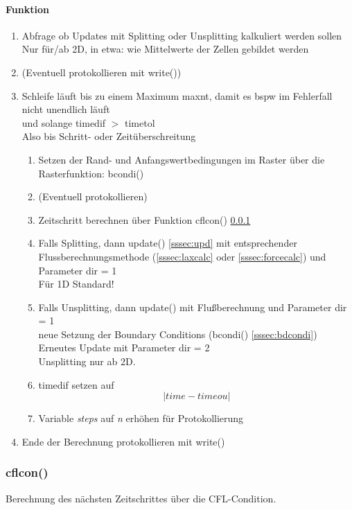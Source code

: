 \documentclass[12pt]{article}
\begin{document}
\paragraph{Funktion}
\renewcommand{\labelenumi}{\theenumi.}
\begin{enumerate}
	\item Abfrage ob Updates mit Splitting oder Unsplitting kalkuliert werden sollen\\
	Nur für/ab 2D, in etwa: wie Mittelwerte der Zellen gebildet werden
	\item (Eventuell protokollieren mit write())
	\item Schleife läuft bis zu einem Maximum maxnt, damit es bspw im Fehlerfall nicht unendlich läuft\\
	und solange timedif $>$ timetol\\
	Also bis Schritt- oder Zeitüberschreitung
	\begin{enumerate}
	\item Setzen der Rand- und Anfangswertbedingungen im Raster über die Rasterfunktion: bcondi()
	\item (Eventuell protokollieren)
	\item Zeitschritt berechnen über Funktion cflcon() \ref{sssec:cflc}
	\item Falls Splitting, dann update() \ref{sssec:upd} mit entsprechender Flussberechnungsmethode (\ref{sssec:laxcalc} oder \ref{sssec:forcecalc}) und Parameter dir = 1\\
	Für 1D Standard!
	\item Falls Unsplitting, dann update() mit Flußberechnung und Parameter dir = 1\\
	neue Setzung der Boundary Conditions (bcondi() \ref{sssec:bdcondi})\\
	Erneutes Update mit Parameter dir = 2\\
	Unsplitting nur ab 2D.
	\item timedif setzen auf 
	\begin{equation}
	|time-timeou|
	\end{equation}
	\item Variable {\em steps} auf {\em n} erhöhen für Protokollierung
	\end{enumerate}
	\item Ende der Berechnung protokollieren mit write()
\end{enumerate} 

\subsubsection{cflcon()} \label{sssec:cflc}
Berechnung des nächsten Zeitschrittes über die CFL-Condition.
\end{document}

